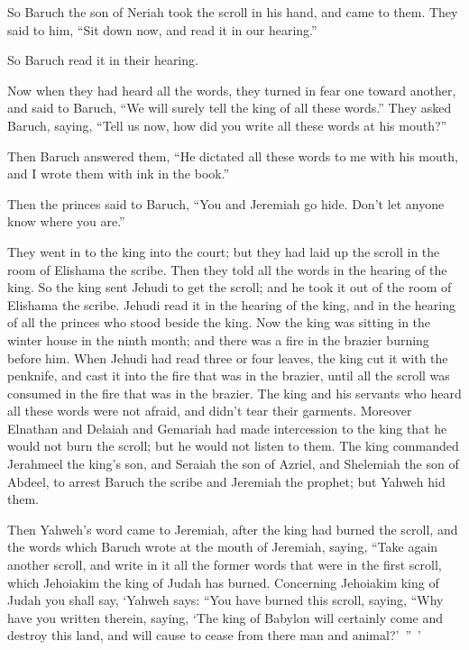 {\par }{\PP So Baruch the son of Neriah took the scroll in his hand, and came to them.
They said to him, “Sit down now, and read it in our hearing.”
\par }{\PP So Baruch read it in their hearing.
\par }{\PP {}Now when they had heard all the words, they turned in fear one toward another, and said to Baruch, “We will surely tell the king of all these words.”
They asked Baruch, saying, “Tell us now, how did you write all these words at his mouth?”
\par }{\PP {}Then Baruch answered them, “He dictated all these words to me with his mouth, and I wrote them with ink in the book.”
\par }{\PP {}Then the princes said to Baruch, “You and Jeremiah go hide. Don’t let anyone know where you are.”
\par }{\PP {}They went in to the king into the court; but they had laid up the scroll in the room of Elishama the scribe. Then they told all the words in the hearing of the king.
So the king sent Jehudi to get the scroll; and he took it out of the room of Elishama the scribe. Jehudi read it in the hearing of the king, and in the hearing of all the princes who stood beside the king.
Now the king was sitting in the winter house in the ninth month; and there was a fire in the brazier burning before him.
When Jehudi had read three or four leaves, the king cut it with the penknife, and cast it into the fire that was in the brazier, until all the scroll was consumed in the fire that was in the brazier.
The king and his servants who heard all these words were not afraid, and didn’t tear their garments.
Moreover Elnathan and Delaiah and Gemariah had made intercession to the king that he would not burn the scroll; but he would not listen to them.
The king commanded Jerahmeel the king’s son, and Seraiah the son of Azriel, and Shelemiah the son of Abdeel, to arrest Baruch the scribe and Jeremiah the prophet; but Yahweh hid them.
\par }{\PP {}Then Yahweh’s word came to Jeremiah, after the king had burned the scroll, and the words which Baruch wrote at the mouth of Jeremiah, saying,
“Take again another scroll, and write in it all the former words that were in the first scroll, which Jehoiakim the king of Judah has burned.
Concerning Jehoiakim king of Judah you shall say, ‘Yahweh says: “You have burned this scroll, saying, “Why have you written therein, saying, ‘The king of Babylon will certainly come and destroy this land, and will cause to cease from there man and animal?’ ” ’
}
